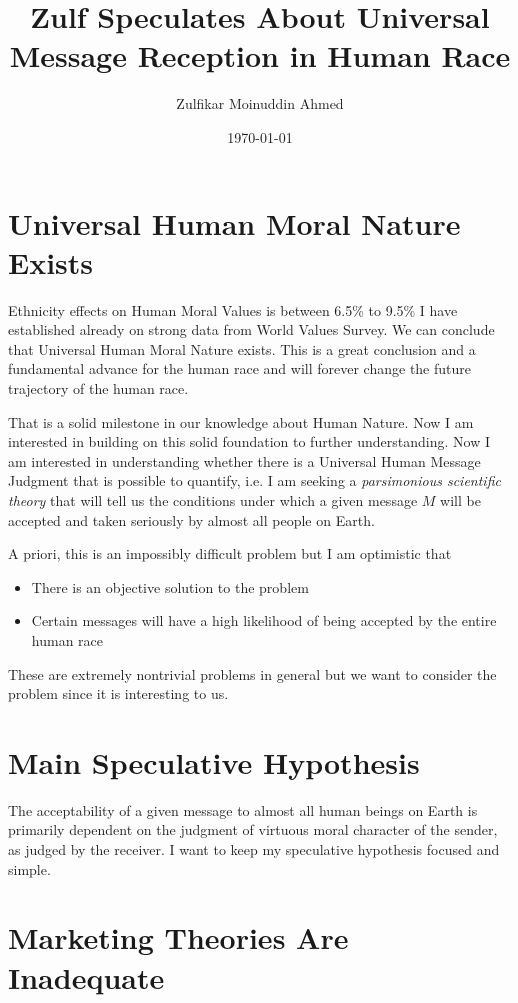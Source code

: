 \documentclass{amsart}
\title{Zulf Speculates About Universal Message Reception in Human Race}
\author{Zulfikar Moinuddin Ahmed}
\date{\today}
\begin{document}
\maketitle

\section{Universal Human Moral Nature Exists}

Ethnicity effects on Human Moral Values is between 6.5\% to 9.5\% I have established already on strong data from World Values Survey.  We can conclude that Universal Human Moral Nature exists.  This is a great conclusion and a fundamental advance for the human race and will forever change the future trajectory of the human race.

That is a solid milestone in our knowledge about Human Nature.  Now I am interested in building on this solid foundation to further understanding.  Now I am interested in understanding whether there is a Universal Human Message Judgment that is possible to quantify, i.e. I am seeking a {\em parsimonious scientific theory} that will tell us the conditions under which a given message $M$ will be accepted and taken seriously by almost all people on Earth.  

A priori, this is an impossibly difficult problem but I am optimistic that
\begin{itemize}
\item{There is an objective solution to the problem}
\item{Certain messages will have a high likelihood of being accepted by the entire human race}
\end{itemize}

These are extremely nontrivial problems in general but we want to consider the problem since it is interesting to us.

\section{Main Speculative Hypothesis}

The acceptability of a given message to almost all human beings on Earth is primarily dependent on the judgment of virtuous moral character of the sender, as judged by the receiver.  I want to keep my speculative hypothesis focused and simple.  

\section{Marketing Theories Are Inadequate}
\end{document}
